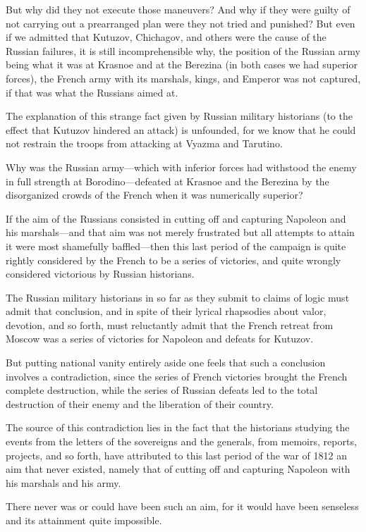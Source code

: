 But why did they not execute those maneuvers? And why if they
were guilty of not carrying out a prearranged plan were they not
tried and punished? But even if we admitted that Kutuzov,
Chichagov, and others were the cause of the Russian failures, it
is still incomprehensible why, the position of the Russian army
being what it was at Krasnoe and at the Berezina (in both cases
we had superior forces), the French army with its marshals,
kings, and Emperor was not captured, if that was what the
Russians aimed at.

The explanation of this strange fact given by Russian military
historians (to the effect that Kutuzov hindered an attack) is
unfounded, for we know that he could not restrain the troops from
attacking at Vyazma and Tarutino.

Why was the Russian army---which with inferior forces had
withstood the enemy in full strength at Borodino---defeated at
Krasnoe and the Berezina by the disorganized crowds of the French
when it was numerically superior?

If the aim of the Russians consisted in cutting off and capturing
Napoleon and his marshals---and that aim was not merely
frustrated but all attempts to attain it were most shamefully
baffled---then this last period of the campaign is quite rightly
considered by the French to be a series of victories, and quite
wrongly considered victorious by Russian historians.

The Russian military historians in so far as they submit to
claims of logic must admit that conclusion, and in spite of their
lyrical rhapsodies about valor, devotion, and so forth, must
reluctantly admit that the French retreat from Moscow was a
series of victories for Napoleon and defeats for Kutuzov.

But putting national vanity entirely aside one feels that such a
conclusion involves a contradiction, since the series of French
victories brought the French complete destruction, while the
series of Russian defeats led to the total destruction of their
enemy and the liberation of their country.

The source of this contradiction lies in the fact that the
historians studying the events from the letters of the sovereigns
and the generals, from memoirs, reports, projects, and so forth,
have attributed to this last period of the war of 1812 an aim
that never existed, namely that of cutting off and capturing
Napoleon with his marshals and his army.

There never was or could have been such an aim, for it would have
been senseless and its attainment quite impossible.

